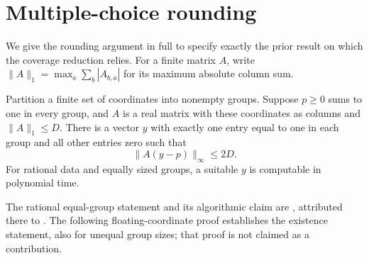 \documentclass[acmsmall,11pt,nonacm]{acmart}
\begin{document}
\section{Multiple-choice rounding}
\label{sec:rounding}

We give the rounding argument in full to specify exactly the prior result
on which the coverage reduction relies. For a finite matrix $A$, write
$\|A\|_1=\max_a\sum_b|A_{b,a}|$ for its maximum absolute column sum.

\begin{lemma}
\label{lem:round}
Partition a finite set of coordinates into nonempty groups. Suppose
$p\ge0$ sums to one in every group, and $A$ is a real matrix with these
coordinates as columns and $\|A\|_1\le D$. There is a vector $y$ with
exactly one entry equal to one in each group and all other entries zero
such that
\begin{equation}
 \|A(y-p)\|_\infty\le 2D.
 \label{eq:round}
\end{equation}
For rational data and equally sized groups, a suitable $y$ is computable
in polynomial time.
\end{lemma}

The rational equal-group statement and its algorithmic claim are
\cite[Theorem~2]{GRW11}, attributed there to \cite{DS03}. The following
floating-coordinate proof establishes the existence statement, also for
unequal group sizes; that proof is not claimed as a contribution.
\end{document}
